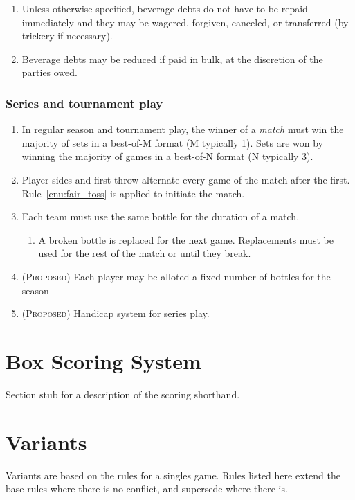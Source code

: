 \documentclass[11pt,letterpaper,twocolumn,english,DIV=calc]{scrartcl}
\newcommand{\proposed}{{\color{DarkRed}\textsc{(Proposed)} }}
\begin{document}
\begin{enumerate}[leftmargin=2.8em, label=\thesubsection.\arabic*]
	\item Unless otherwise specified, beverage debts do not have to be repaid immediately and they may be wagered, forgiven, canceled, or transferred (by trickery if necessary). 
	\item Beverage debts may be reduced if paid in bulk, at the discretion of the parties owed.
\end{enumerate}

\section{Series and tournament play}
\begin{enumerate}[label=\thesection.\arabic*]
	\item In regular season and tournament play, the winner of a \emph{match} must win the majority of sets in a best-of-M format (M typically 1). Sets are won by winning the majority of games in a best-of-N format (N typically 3).
	\item Player sides and first throw alternate every game of the match after the first.
	Rule~\ref{enu:fair_toss} is applied to initiate the match.
	
	\item Each team must use the same bottle for the duration of a match.

	\begin{enumerate}
		\item A broken bottle is replaced for the next game. 
		Replacements must be used for the rest of the match or until they break.
	\end{enumerate}
	\item \proposed Each player may be alloted a fixed number of bottles for the season
	\item \proposed Handicap system for series play.

\end{enumerate}

\newpage
\part*{Box Scoring System}
Section stub for a description of the scoring shorthand.

\part*{Variants}
\label{part:variants}

Variants are based on the rules for a singles game. Rules listed here extend the base rules where there is no conflict, and supersede where there is.
\end{document}
